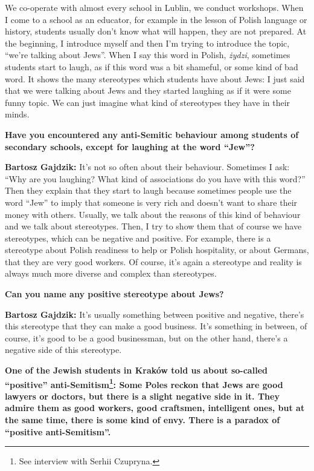 We co-operate with almost every school in Lublin, we conduct workshops. When I come to a school as an educator, for example in the lesson of Polish language or history, students usually don’t know what will happen, they are not prepared. At the beginning, I introduce myself and then I’m trying to introduce the topic, ``we’re talking about Jews''. When I say this word in Polish, \textit{żydzi}, sometimes students start to laugh, as if this word was a bit shameful, or some kind of bad word. It shows the many stereotypes which students have about Jews: I just said that we were talking about Jews and they started laughing as if it were some funny topic. We can just imagine what kind of stereotypes they have in their minds. 

\textbf{Have you encountered any anti-Semitic behaviour among students of secondary schools, except for laughing at the word ``Jew''?} 

\textbf{Bartosz Gajdzik:} It’s not so often about their behaviour. Sometimes I ask: ``Why are you laughing? What kind of associations do you have with this word?'' Then they explain that they start to laugh because sometimes people use the word ``Jew'' to imply that someone is very rich and doesn’t want to share their money with others. Usually, we talk about the reasons of this kind of behaviour and we talk about stereotypes. Then, I try to show them that of course we have stereotypes, which can be negative and positive. For example, there is a stereotype about Polish readiness to help or Polish hospitality, or about Germans, that they are very good workers. Of course, it’s again a stereotype and reality is always much more diverse and complex than stereotypes. 

\textbf{Can you name any positive stereotype about Jews?} 

\textbf{Bartosz Gajdzik:} It’s usually something between positive and negative, there’s this stereotype that they can make a good business. It’s something in between, of course, it’s good to be a good businessman, but on the other hand, there’s a negative side of this stereotype.

\textbf{One of the Jewish students in Kraków told us about so-called ``positive'' anti-Semitism\footnote{See interview with Serhii Czupryna.}: Some Poles reckon that Jews are good lawyers or doctors, but there is a slight negative side in it. They admire them as good workers, good craftsmen, intelligent ones, but at the same time, there is some kind of envy. There is a paradox of ``positive anti-Semitism''.} 

